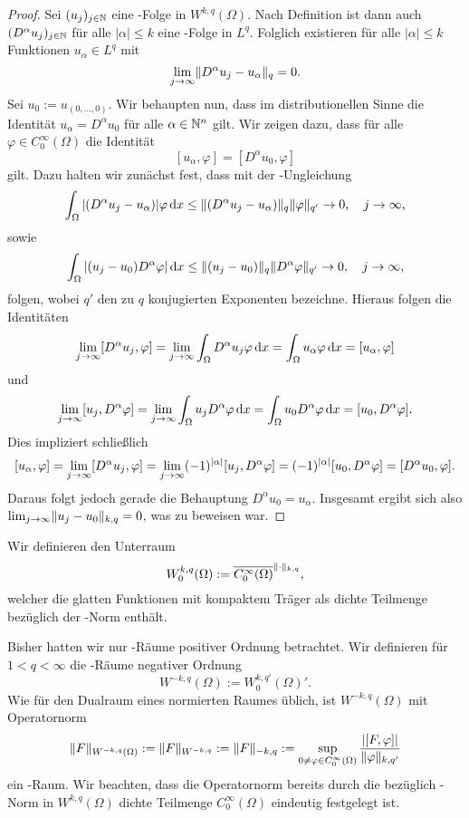 \begin{proof}
  Sei $(u_j)_{j \in \mathbb{N}}$ eine \cauchy\hyp{}Folge in $W^{k,q}(\Omega)$.
  Nach Definition ist dann auch $(D^\alpha u_j)_{j \in \mathbb{N}}$ für alle $|\alpha| \leq k$ eine \cauchy\hyp{}Folge in $L^q$.
  Folglich existieren für alle $|\alpha| \leq k$ Funktionen $u_\alpha \in L^q$ mit 
  $$
  \lim_{j \to \infty} \lVert D^\alpha u_j - u_\alpha \rVert_q = 0.
  $$
  Sei $u_0 := u_{(0,\dots,0)}$.
  Wir behaupten nun, dass im distributionellen Sinne die Identität $u_\alpha = D^\alpha u_0$ für alle $\alpha \in \mathbb{N}^n$ gilt.
  Wir zeigen dazu, dass für alle $\varphi \in C_0^\infty(\Omega)$ die Identität
  $$
  [u_\alpha, \varphi] = [D^\alpha u_0, \varphi]
  $$
  gilt.
  Dazu halten wir zunächst fest, dass mit der \hoelder\hyp{}Ungleichung
  $$
  \int_\Omega |(D^\alpha u_j - u_\alpha)| \varphi \, {\operatorname{d}\!{x}}
  \leq \lVert (D^\alpha u_j - u_\alpha) \rVert_q \lVert \varphi \rVert_{q'} \to 0, \quad j \to \infty,
  $$
  sowie
  $$
  \int_\Omega |(u_j - u_0) D^\alpha \varphi| \, {\operatorname{d}\!{x}}
  \leq \lVert (u_j - u_0) \rVert_q \lVert D^\alpha \varphi \rVert_{q'} \to 0, \quad j \to \infty,
  $$
  folgen, wobei $q'$ den zu $q$ konjugierten Exponenten bezeichne.
  Hieraus folgen die Identitäten
  $$
  \lim_{j \to \infty} [D^\alpha u_j, \varphi] = \lim_{j \to \infty} \int_\Omega D^\alpha u_j \varphi \, {\operatorname{d}\!{x}} =  \int_\Omega u_\alpha \varphi \, {\operatorname{d}\!{x}} =  [u_\alpha, \varphi] 
  $$
  und
  $$
    \lim_{j \to \infty} [u_j, D^\alpha\varphi] = \lim_{j \to \infty} \int_\Omega u_j D^\alpha\varphi \, {\operatorname{d}\!{x}} =  \int_\Omega u_0 D^\alpha \varphi \, {\operatorname{d}\!{x}} = [u_0, D^\alpha \varphi].
  $$
  Dies impliziert schließlich
  $$ 
  [u_\alpha, \varphi] 
  = \lim_{j \to \infty} [D^\alpha u_j, \varphi] \\
  = \lim_{j \to \infty} (-1)^{|\alpha|}[u_j, D^\alpha \varphi] \\
  =  (-1)^{|\alpha|}[u_0, D^\alpha \varphi]
  = [D^\alpha u_0, \varphi].
  $$
  Daraus folgt jedoch gerade die Behauptung $D^\alpha u_0 = u_\alpha$.
  Insgesamt ergibt sich also $\lim_{j \to \infty} \lVert u_j - u_0 \rVert_{k,q} =  0$, was zu beweisen war.
\end{proof}

Wir definieren den Unterraum
$$
  W_0^{k,q}(\Omega) := \overline{C_0^\infty(\Omega)}^{\lVert \cdot \rVert_{k,q}},
$$
welcher die glatten Funktionen mit kompaktem Träger als dichte Teilmenge bezüglich der \sobolev\hyp{}Norm enthält.

Bisher hatten wir nur \sobolev\hyp{}Räume positiver Ordnung betrachtet.
Wir definieren für $1 < q < \infty$ die \sobolev\hyp{}Räume negativer Ordnung 
$$
  W^{-k,q}(\Omega) := W_0^{k,q'}(\Omega)'.
$$
Wie für den Dualraum eines normierten Raumes üblich, ist $W^{-k,q}(\Omega)$ mit Operatornorm 
$$
\lVert F \rVert_{W^{-k,q}(\Omega)} := \lVert F \rVert_{W^{-k,q}} := \lVert F \rVert_{-k,q} := \sup_{0 \neq \varphi \in C_0^\infty(\Omega)} \frac{|[F,\varphi]|}{\lVert \varphi \rVert_{k,q'}}
$$
ein \banach\hyp{}Raum.
Wir beachten, dass die Operatornorm bereits durch die bezüglich \sobolev\hyp{}Norm in $W^{k,q}(\Omega)$ dichte Teilmenge $C_0^\infty(\Omega)$ eindeutig festgelegt ist.

